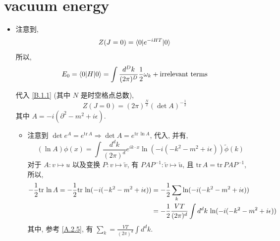 \section{vacuum energy}
\begin{itemize}
	\item 注意到,
	\begin{equation} \label{1.4.1}
		Z(J = 0) = \braket{0 | e^{- i H T} | 0}
	\end{equation}
	所以,
	\begin{equation}
		E_0 = \braket{0 | H | 0} = \int \frac{d^D k}{(2 \pi)^D} \frac{1}{2} \omega_k + \text{irrelevant terms}
	\end{equation}
	
	\begin{tcolorbox}[title=calculation:]
		代入 \eqref{B.1.1} (其中 $N$ 是时空格点总数),
		\begin{equation}
			Z(J = 0) = (2 \pi)^{\frac{N}{2}} (\det A)^{- \frac{1}{2}}
		\end{equation}
		其中 $A = - i (\partial^2 - m^2 + i \epsilon)$.
		\begin{itemize}
			\item 注意到 $\det e^A = e^{\mathrm{tr} \, A} \Longrightarrow \det A = e^{\mathrm{tr} \, \ln A}$, 代入, 并有,
			\begin{equation}
				(\ln A) \phi(x) = \int \frac{d^d k}{(2 \pi)^d} e^{i k \cdot x} \ln(- i (- k^2 - m^2 + i \epsilon)) \tilde{\phi}(k)
			\end{equation}
			对于 $A : v \mapsto u$ 以及变换 $P : v \mapsto \tilde{v}$, 有 $P A P^{- 1} : \tilde{v} \mapsto \tilde{u}$, 且 $\mathrm{tr} \, A = \mathrm{tr} \, P A P^{- 1}$, 所以,
			\begin{align}
				- \frac{1}{2} \mathrm{tr} \, \ln A = - \frac{1}{2} \mathrm{tr} \, \ln(- i (- k^2 - m^2 + i \epsilon)) &= - \frac{1}{2} \sum_k \ln(- i (- k^2 - m^2 + i \epsilon)) \notag \\
				&= - \frac{1}{2} \frac{V T}{(2 \pi)^d} \int d^d k \, \ln(- i (- k^2 - m^2 + i \epsilon))
			\end{align}
			其中, 参考 \eqref{A.2.5}, 有 $\sum_k = \frac{V T}{(2 \pi)^d} \int d^d k$.
		\end{itemize}
		

\end{tcolorbox}
\end{itemize}
